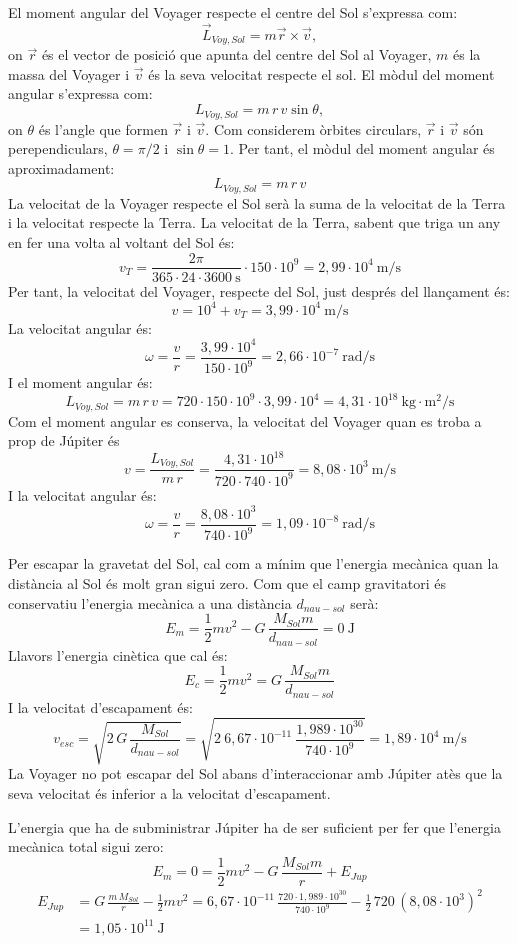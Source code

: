 \begin{solapartat}
El moment angular del Voyager respecte el centre del Sol s'expressa com:
\[ \vec{L}_{Voy,Sol} = m\vec{r}\times\vec{v}, \]
on $\vec{r}$ és el vector de posició que apunta del centre del Sol al Voyager, $m$ és la massa del Voyager i $\vec{v}$ és la seva velocitat respecte el sol. El mòdul del moment angular s'expressa com:
\[ L_{Voy,Sol} = m\,r\,v\sin\theta, \]
on $\theta$ és l'angle que formen $\vec{r}$ i $\vec{v}$. Com considerem òrbites circulars, $\vec{r}$ i $\vec{v}$ són perependiculars, $\theta = \pi/2$ i $\sin\theta = 1$. Per tant, el mòdul del moment angular és aproximadament:
\[ L_{Voy,Sol} = m\,r\,v \]
La velocitat de la Voyager respecte el Sol serà la suma de la velocitat de la Terra i la velocitat respecte la Terra. La velocitat de la Terra, sabent que triga un any en fer una volta al voltant del Sol és:
\[ v_T = \frac{2\pi}{365\cdot 24\cdot 3600\ \mathrm{s}}\cdot 150\cdot 10^{9} = 2,99\cdot 10^{4}\ \mathrm{m/s} \]
Per tant, la velocitat del Voyager, respecte del Sol, just després del llançament és:
\[ v = 10^{4} + v_T = 3,99\cdot 10^{4}\ \mathrm{m/s} \]
La velocitat angular és:
\[ \omega = \frac{v}{r} = \frac{3,99\cdot 10^{4}}{150\cdot 10^{9}} = 2,66\cdot 10^{-7}\ \mathrm{rad/s} \]
I el moment angular és:
\[ L_{Voy,Sol} = m\,r\,v = 720\cdot 150\cdot 10^{9}\cdot 3,99\cdot 10^{4} = 4,31\cdot 10^{18}\ \mathrm{kg\cdot m^2/s} \]
Com el moment angular es conserva, la velocitat del Voyager quan es troba a prop de Júpiter és
\[ v = \frac{L_{Voy,Sol}}{m\,r} = \frac{4,31\cdot 10^{18}}{720\cdot 740\cdot 10^{9}} = 8,08\cdot 10^{3}\ \mathrm{m/s} \]
I la velocitat angular és:
\[ \omega = \frac{v}{r} = \frac{8,08\cdot 10^{3}}{740\cdot 10^{9}} = 1,09\cdot 10^{-8}\ \mathrm{rad/s} \]
\end{solapartat}

\begin{solapartat}
Per escapar la gravetat del Sol, cal com a mínim que l'energia mecànica quan la distància al Sol és molt gran sigui zero. Com que el camp gravitatori és conservatiu l'energia mecànica a una distància $d_{nau-sol}$ serà:
\[ E_m = \frac{1}{2}mv^2 - G\,\frac{M_{Sol}m}{d_{nau-sol}} = 0\ \mathrm{J} \]
Llavors l'energia cinètica que cal és:
\[ E_c = \frac{1}{2}mv^2 = G\,\frac{M_{Sol}m}{d_{nau-sol}} \]
I la velocitat d'escapament és:
\[ v_{esc} = \sqrt{2\,G\,\frac{M_{Sol}}{d_{nau-sol}}} = \sqrt{2\ 6,67\cdot 10^{-11}\ \frac{1,989\cdot 10^{30}}{740\cdot 10^{9}}} = 1,89\cdot 10^{4}\ \mathrm{m/s} \]
La Voyager no pot escapar del Sol abans d'interaccionar amb Júpiter atès que la seva velocitat és inferior a la velocitat d'escapament.

L'energia que ha de subministrar Júpiter ha de ser suficient per fer que l'energia mecànica total sigui zero:
\[ E_m = 0 = \frac{1}{2}mv^2 - G\,\frac{M_{Sol}m}{r} + E_{Jup} \]
\begin{align*}
E_{Jup} &= G\,\frac{m\,M_{Sol}}{r} - \frac{1}{2}mv^2 = 6,67\cdot 10^{-11}\,\frac{720\cdot 1,989\cdot 10^{30}}{740\cdot 10^{9}} - \frac{1}{2}\,720\,(8,08\cdot 10^{3})^2\\
&= 1,05\cdot 10^{11}\ \mathrm{J}
\end{align*}
\end{solapartat}
